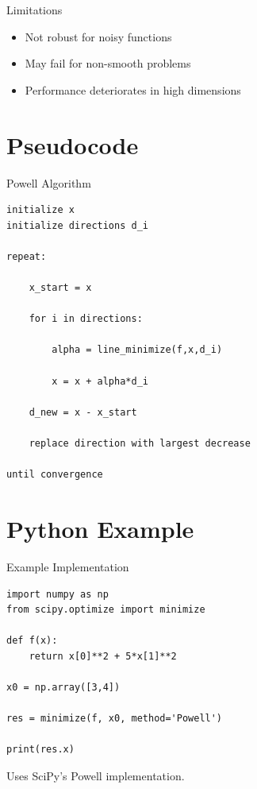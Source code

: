 \documentclass[aspectratio=169]{beamer}
\begin{document}
\begin{frame}{Limitations}

\begin{itemize}
\item Not robust for noisy functions
\item May fail for non-smooth problems
\item Performance deteriorates in high dimensions
\end{itemize}
\end{frame}

\section{Pseudocode}

\begin{frame}[fragile]{Powell Algorithm}

\begin{verbatim}
initialize x
initialize directions d_i

repeat:

    x_start = x

    for i in directions:

        alpha = line_minimize(f,x,d_i)

        x = x + alpha*d_i

    d_new = x - x_start

    replace direction with largest decrease

until convergence
\end{verbatim}

\end{frame}

\section{Python Example}

\begin{frame}[fragile]{Example Implementation}

\begin{verbatim}
import numpy as np
from scipy.optimize import minimize

def f(x):
    return x[0]**2 + 5*x[1]**2

x0 = np.array([3,4])

res = minimize(f, x0, method='Powell')

print(res.x)
\end{verbatim}

Uses SciPy's Powell implementation.
\end{frame}
\end{document}
